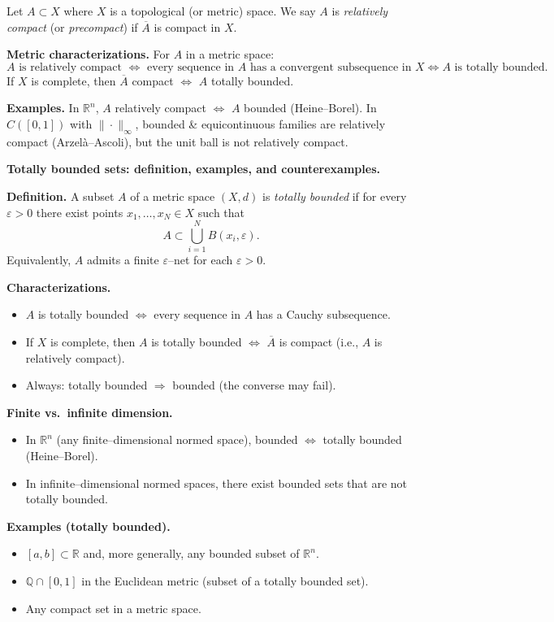 \documentclass[12pt,a4paper]{article}
\begin{document}
	Let $A\subset X$ where $X$ is a topological (or metric) space.
	We say $A$ is \emph{relatively compact} (or \emph{precompact}) if $\overline{A}$ is compact in $X$.
	
	\medskip
	\textbf{Metric characterizations.}
	For $A$ in a metric space:
	\[
	A \text{ is relatively compact }
	\iff \text{ every sequence in } A \text{ has a convergent subsequence in } X
	\iff A \text{ is totally bounded.}
	\]
	If $X$ is complete, then $\overline{A}$ compact $\iff$ $A$ totally bounded.
	
	\medskip
	\textbf{Examples.}
	In $\mathbb{R}^n$, $A$ relatively compact $\iff$ $A$ bounded (Heine--Borel).
	In $C([0,1])$ with $\|\cdot\|_\infty$, bounded \& equicontinuous families are relatively compact (Arzel\`a--Ascoli),
	but the unit ball is not relatively compact.
	
{\large\bfseries Totally bounded sets: definition, examples, and counterexamples.\par}


	
	\medskip
	\textbf{Definition.}
	A subset $A$ of a metric space $(X,d)$ is \emph{totally bounded} if
	for every $\varepsilon>0$ there exist points $x_1,\dots,x_N\in X$
	such that
	\[
	A \subset \bigcup_{i=1}^N B(x_i,\varepsilon).
	\]
	Equivalently, $A$ admits a finite $\varepsilon$--net for each $\varepsilon>0$.
	
	\medskip
	\textbf{Characterizations.}
	\begin{itemize}
		\item $A$ is totally bounded $\iff$ every sequence in $A$ has a Cauchy subsequence.
		\item If $X$ is complete, then $A$ is totally bounded $\iff$ $\overline{A}$ is compact (i.e., $A$ is relatively compact).
		\item Always: totally bounded $\Rightarrow$ bounded (the converse may fail).
	\end{itemize}
	
	\medskip
	\textbf{Finite vs.\ infinite dimension.}
	\begin{itemize}
		\item In $\mathbb{R}^n$ (any finite--dimensional normed space), bounded $\iff$ totally bounded (Heine--Borel).
		\item In infinite--dimensional normed spaces, there exist bounded sets that are not totally bounded.
	\end{itemize}
	
	\medskip
	\textbf{Examples (totally bounded).}
	\begin{itemize}
		\item $[a,b]\subset\mathbb{R}$ and, more generally, any bounded subset of $\mathbb{R}^n$.
		\item $\mathbb{Q}\cap[0,1]$ in the Euclidean metric (subset of a totally bounded set).
		\item Any compact set in a metric space.
	\end{itemize}
	
\end{document}

